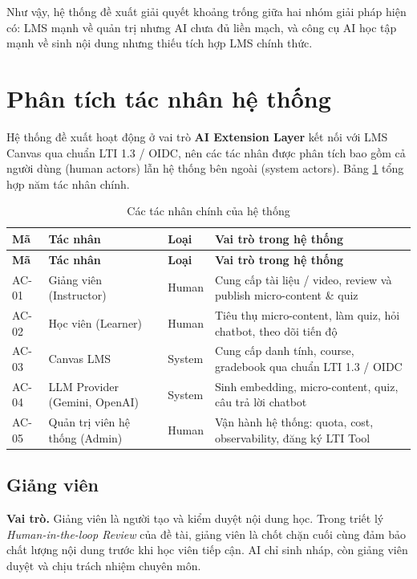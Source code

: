 Như vậy, hệ thống đề xuất giải quyết khoảng trống giữa hai nhóm giải pháp hiện
có: LMS mạnh về quản trị nhưng AI chưa đủ liền mạch, và công cụ AI học tập mạnh
về sinh nội dung nhưng thiếu tích hợp LMS chính thức.

\section{Phân tích tác nhân hệ thống}
\label{sec:phan-tich-tac-nhan-he-thong}

Hệ thống đề xuất hoạt động ở vai trò \textbf{AI Extension Layer} kết nối với
LMS Canvas qua chuẩn LTI 1.3 / OIDC, nên các tác nhân được phân tích bao gồm
cả người dùng (human actors) lẫn hệ thống bên ngoài (system actors). Bảng
\ref{tab:tac-nhan-he-thong} tổng hợp năm tác nhân chính.

\begin{longtable}{|p{1.5cm}|p{4cm}|p{2cm}|p{6cm}|}
\caption{Các tác nhân chính của hệ thống}
\label{tab:tac-nhan-he-thong}\\
\hline
\textbf{Mã} & \textbf{Tác nhân} & \textbf{Loại} & \textbf{Vai trò trong hệ thống} \\
\hline
\endfirsthead
\hline
\textbf{Mã} & \textbf{Tác nhân} & \textbf{Loại} & \textbf{Vai trò trong hệ thống} \\
\hline
\endhead
AC-01 & Giảng viên (Instructor) & Human & Cung cấp tài liệu / video, review và publish micro-content \& quiz \\
\hline
AC-02 & Học viên (Learner) & Human & Tiêu thụ micro-content, làm quiz, hỏi chatbot, theo dõi tiến độ \\
\hline
AC-03 & Canvas LMS & System & Cung cấp danh tính, course, gradebook qua chuẩn LTI 1.3 / OIDC \\
\hline
AC-04 & LLM Provider (Gemini, OpenAI) & System & Sinh embedding, micro-content, quiz, câu trả lời chatbot \\
\hline
AC-05 & Quản trị viên hệ thống (Admin) & Human & Vận hành hệ thống: quota, cost, observability, đăng ký LTI Tool \\
\hline
\end{longtable}

\subsection{Giảng viên}

\textbf{Vai trò.} Giảng viên là người tạo và kiểm duyệt nội dung học. Trong
triết lý \textit{Human-in-the-loop Review} của đề tài, giảng viên là chốt chặn
cuối cùng đảm bảo chất lượng nội dung trước khi học viên tiếp cận. AI chỉ sinh
nháp, còn giảng viên duyệt và chịu trách nhiệm chuyên môn.

